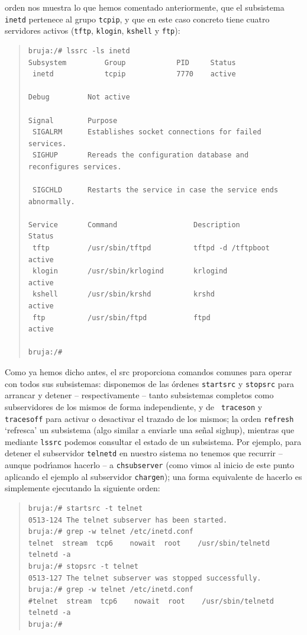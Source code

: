 orden nos muestra lo que hemos comentado anteriormente, que el subsistema {\tt 
inetd} pertenece al grupo {\tt tcpip}, y que en este caso concreto tiene
cuatro servidores activos ({\tt tftp}, {\tt klogin}, {\tt kshell} y {\tt ftp}):
\begin{quote}
\begin{verbatim}
bruja:/# lssrc -ls inetd
Subsystem         Group            PID     Status 
 inetd            tcpip            7770    active
  
Debug         Not active 
  
Signal        Purpose 
 SIGALRM      Establishes socket connections for failed services. 
 SIGHUP       Rereads the configuration database and reconfigures services. 
  
 SIGCHLD      Restarts the service in case the service ends abnormally. 
  
Service       Command                  Description              Status 
 tftp         /usr/sbin/tftpd          tftpd -d /tftpboot       active
 klogin       /usr/sbin/krlogind       krlogind                 active
 kshell       /usr/sbin/krshd          krshd                    active
 ftp          /usr/sbin/ftpd           ftpd                     active
  
bruja:/#
\end{verbatim}
\end{quote}
Como ya hemos dicho antes, el {\sc src} proporciona comandos comunes para
operar con todos sus subsistemas: disponemos de las \'ordenes {\tt startsrc} y 
{\tt stopsrc} para arrancar y detener -- respectivamente -- tanto subsistemas 
completos como subservidores de los mismos de forma independiente, y de {\tt 
traceson} y {\tt tracesoff} para activar o desactivar el trazado de los mismos;
la orden {\tt refresh} `refresca' un subsistema (algo similar a enviarle una 
se\~nal {\sc sighup}), mientras que mediante {\tt lssrc} podemos consultar el 
estado de un subsistema. Por ejemplo, para detener el subservidor {\tt telnetd} 
en nuestro sistema no tenemos que recurrir -- aunque podr\'{\i}amos hacerlo --
a {\tt chsubserver} (como vimos al inicio de este punto aplicando el ejemplo al
subservidor {\tt chargen}); una forma equivalente de hacerlo es simplemente 
ejecutando la siguiente orden:
\begin{quote}
\begin{verbatim}
bruja:/# startsrc -t telnet
0513-124 The telnet subserver has been started.
bruja:/# grep -w telnet /etc/inetd.conf
telnet  stream  tcp6    nowait  root    /usr/sbin/telnetd      telnetd -a
bruja:/# stopsrc -t telnet
0513-127 The telnet subserver was stopped successfully.
bruja:/# grep -w telnet /etc/inetd.conf
#telnet  stream  tcp6    nowait  root    /usr/sbin/telnetd      telnetd -a
bruja:/# 
\end{verbatim}
\end{quote}

